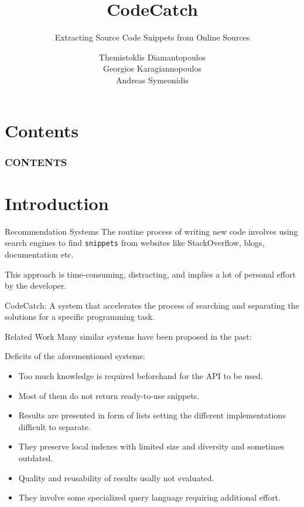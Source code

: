 \documentclass[compress]{beamer}
\title{CodeCatch}
\subtitle{Extracting Source Code Snippets from Online Sources}
\author{Themistoklis Diamantopoulos\\ Georgios Karagiannopoulos\\ Andreas Symeonidis}
\institute{Electrical \& Computer Engineering Dept.\\ Aristotle University of Thessaloniki}
\begin{document}
\maketitle

\section*{Contents}
\begin{frame}
	\frametitle{CONTENTS}
	\tableofcontents[hideallsubsections]
\end{frame}

\section{Introduction}

\begin{frame}{Recommendation Systems}
The routine process of writing new code involves using search engines to find \lstinline!snippets! from websites like StackOverflow, blogs, documentation etc.

\vfill
This approach is time-consuming, distracting, and implies a lot of personal effort by the developer.

\vfill
{\Medium CodeCatch}: A system that accelerates the process of searching and separating the solutions for a specific programming task.


\end{frame}

\begin{frame}{Related Work}
Many similar systems have been proposed in the past:


\alert{Deficits} of the aforementioned systems:

\begin{itemize}
	\item Too much knowledge is required beforehand for the API to be used.
	\item Most of them do not return ready-to-use snippets.
	\item Results are presented in form of lists setting the different implementations difficult to separate.
	\item They preserve local indexes with limited size and diversity and sometimes outdated.
	\item Quality and reusability of results usally not evaluated.
	\item They involve some specialized query language requiring additional effort.
\end{itemize}

\end{frame}
\end{document}
